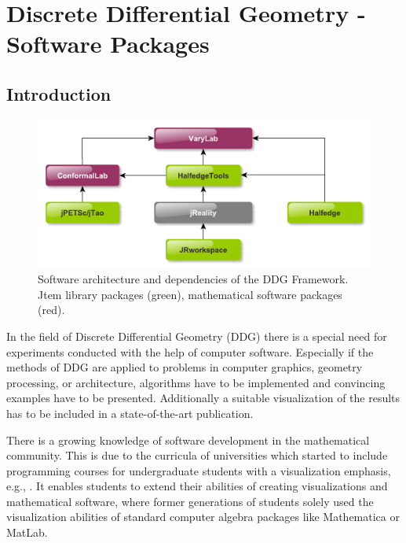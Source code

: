 \chapter{Discrete Differential Geometry - Software Packages}

\section{Introduction}

\begin{figure}[h]
	\centering
	\includegraphics[width=\linewidth]{figures/software_architecture}
	\caption[Software package dependencies]{
		Software architecture and dependencies of the DDG Framework. 
		{\sc Jtem} library packages (green), mathematical software packages (red).
	}
	\label{fig:software_architecture}
\end{figure}

In the field of Discrete Differential Geometry (DDG) there is a special need for experiments
conducted with the help of computer software. Especially if the methods of DDG are applied
to problems in computer graphics, geometry processing, or architecture, algorithms have 
to be implemented and convincing examples have to be presented. Additionally a suitable 
visualization of the results has to be included in a state-of-the-art publication.

There is a growing knowledge of software development in the mathematical community. This 
is due to the curricula of universities which started to include programming courses for 
undergraduate students with a visualization emphasis, e.g., \cite{VisMathHomepage, 
CaltechVisMath}. It enables students to extend their abilities of creating visualizations and 
mathematical software, where former generations of students solely used the visualization 
abilities of standard computer algebra packages like Mathematica or MatLab.

